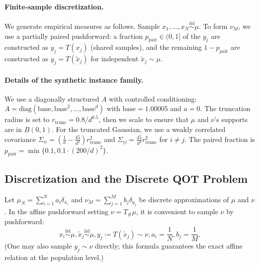 \documentclass{article}
\theoremstyle{plain}
\theoremstyle{definition}
\theoremstyle{remark}
\numberwithin{equation}{section}
\begin{document}
\paragraph{Finite-sample discretization.}
We generate empirical measures as follows. Sample $x_1,\dots,x_N\stackrel{\mathrm{iid}}{\sim}\mu$.
To form $\nu_M$, we use a partially paired pushforward: a fraction $p_{\mathrm{pair}}\in(0,1]$ of the $y_j$ are constructed as $y_j=T(x_j)$ (shared samples), and the remaining $1-p_{\mathrm{pair}}$ are constructed as $y_j=T(\tilde x_j)$ for independent $\tilde x_j\sim\mu$.
\paragraph{Details of the synthetic instance family.}
We use a diagonally structured $A$ with controlled conditioning: $A=\mathrm{diag}(\mathrm{base},\mathrm{base}^2,\dots,\mathrm{base}^d)$ with $\mathrm{base}=1.00005$ and $a=0$.
The truncation radius is set to $r_{\mathrm{trunc}}=0.8/d^{0.5}$, then we scale to ensure that $\mu$ and $\nu$'s supports are in $B(0,1)$.
For the truncated Gaussian, we use a weakly correlated covariance $\Sigma_{ii}=(\frac1d-\frac{45}{d^2})r_{\mathrm{trunc}}^2$ and $\Sigma_{ij}=\frac{45}{d^2}r_{\mathrm{trunc}}^2$ for $i\neq j$.
The paired fraction is $p_{\mathrm{pair}}=\min\{0.1,0.1\cdot(200/d)^2\}$.
\subsection{Discretization and the Discrete QOT Problem}\label{sec:exp-discrete-qot}
Let $\mu_N=\sum_{i=1}^Na_i\delta_{x_i}$ and $\nu_M=\sum_{j=1}^Mb_j\delta_{y_j}$ be discrete approximations of $\mu$ and $\nu$.
In the affine pushforward setting $\nu=T_\#\mu$, it is convenient to sample $\nu$ by pushforward:
\[
x_i\stackrel{\mathrm{iid}}{\sim}\mu,\tilde x_j\stackrel{\mathrm{iid}}{\sim}\mu,y_j\coloneqq T(\tilde x_j)\sim \nu,a_i=\frac1N,b_j=\frac1M.
\]
(One may also sample $y_j\sim\nu$ directly; this formula guarantees the exact affine relation at the population level.)
\end{document}
